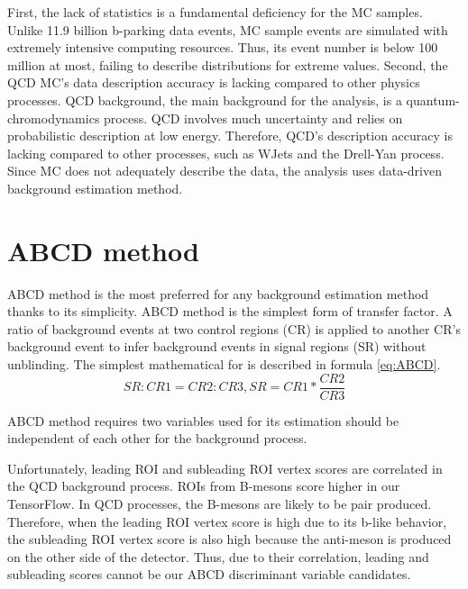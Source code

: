 First, the lack of statistics is a fundamental deficiency for the MC samples.
Unlike 11.9 billion b-parking data events, MC sample events are simulated with extremely intensive computing resources.
Thus, its event number is below 100 million at most, failing to describe distributions for extreme values.
Second, the QCD MC's data description accuracy is lacking compared to other physics processes.
QCD background, the main background for the analysis, is a quantum-chromodynamics process.
QCD involves much uncertainty and relies on probabilistic description at low energy.
Therefore, QCD's description accuracy is lacking compared to other processes, such as WJets and the Drell-Yan process.
Since MC does not adequately describe the data, the analysis uses data-driven background estimation method.




\section{ABCD method}
ABCD method is the most preferred for any background estimation method thanks to its simplicity.
ABCD method is the simplest form of transfer factor.
A ratio of background events at two control regions (CR) is applied to another CR's background event to infer background events in signal regions (SR) without unblinding.
The simplest mathematical for is described in formula \ref{eq:ABCD}.
\begin{equation}
\label{eq:ABCD}
	SR:CR1=CR2:CR3, SR=CR1*\frac{CR2}{CR3} 
\end{equation}

ABCD method requires two variables used for its estimation should be independent of each other for the background process.


Unfortunately, leading ROI and subleading ROI vertex scores are correlated in the QCD background process.
ROIs from B-mesons score higher in our TensorFlow.
In QCD processes, the B-mesons are likely to be pair produced.
Therefore, when the leading ROI vertex score is high due to its b-like behavior, the subleading ROI vertex score is also high because the anti-meson is produced on the other side of the detector.
Thus, due to their correlation, leading and subleading scores cannot be our ABCD discriminant variable candidates.

